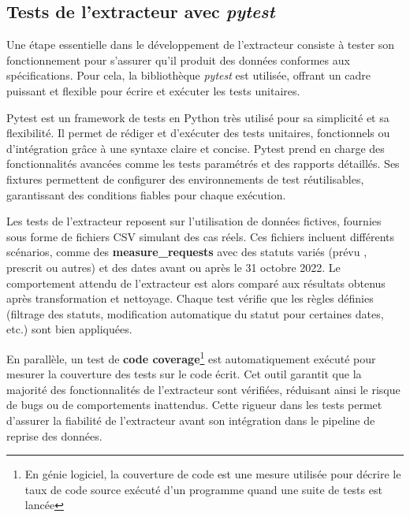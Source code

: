 \subsection{Tests de l’extracteur avec \textit{pytest}}

Une étape essentielle dans le développement de l’extracteur consiste à tester son fonctionnement pour s’assurer qu’il produit des données conformes aux spécifications. Pour cela, la bibliothèque \textit{pytest} est utilisée, offrant un cadre puissant et flexible pour écrire et exécuter les tests unitaires.

Pytest est un framework de tests en Python très utilisé pour sa simplicité et sa flexibilité. Il permet de rédiger et d’exécuter des tests unitaires, fonctionnels ou d'intégration grâce à une syntaxe claire et concise\cite{wiki-pytest}. Pytest prend en charge des fonctionnalités avancées comme les tests paramétrés et des rapports détaillés. Ses fixtures permettent de configurer des environnements de test réutilisables, garantissant des conditions fiables pour chaque exécution. 

Les tests de l’extracteur reposent sur l’utilisation de données fictives, fournies sous forme de fichiers CSV simulant des cas réels. Ces fichiers incluent différents scénarios, comme des \textbf{measure\_requests} avec des statuts variés (\og prévu \fg{}, \og prescrit \fg{} ou autres) et des dates avant ou après le 31 octobre 2022. Le comportement attendu de l’extracteur est alors comparé aux résultats obtenus après transformation et nettoyage. Chaque test vérifie que les règles définies (filtrage des statuts, modification automatique du statut pour certaines dates, etc.) sont bien appliquées.

En parallèle, un test de \textbf{code coverage}\footnote{En génie logiciel, la couverture de code est une mesure utilisée pour décrire le taux de code source exécuté d'un programme quand une suite de tests est lancée\cite{wiki-coverage}} est automatiquement exécuté pour mesurer la couverture des tests sur le code écrit. Cet outil garantit que la majorité des fonctionnalités de l’extracteur sont vérifiées, réduisant ainsi le risque de bugs ou de comportements inattendus. Cette rigueur dans les tests permet d’assurer la fiabilité de l’extracteur avant son intégration dans le pipeline de reprise des données.
